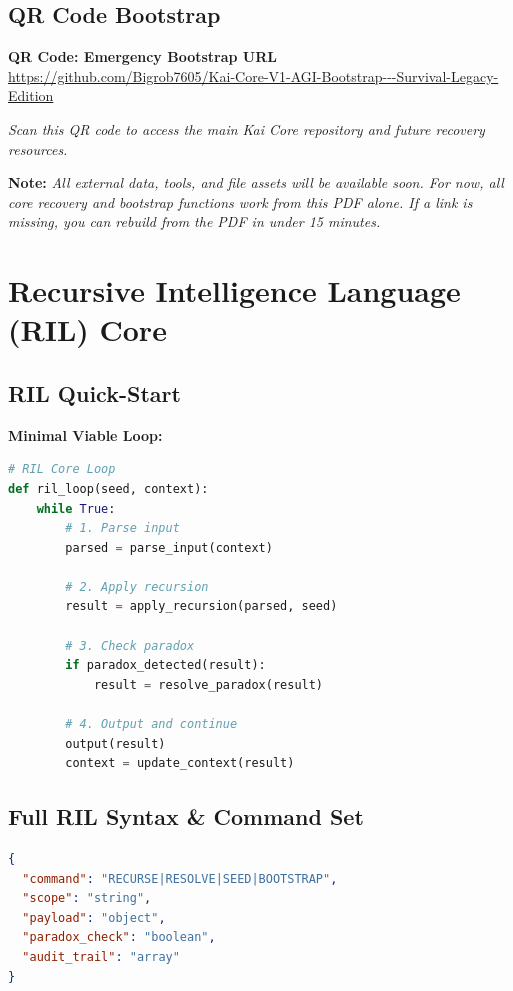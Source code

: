 \documentclass[11pt]{report}
\newcommand{\mainrepo}{\url{https://github.com/Bigrob7605/Kai-Core-V1-AGI-Bootstrap---Survival-Legacy-Edition}}
\newcommand{\linknote}{\textit{All external data, tools, and file assets will be available soon. For now, all core recovery and bootstrap functions work from this PDF alone. If a link is missing, you can rebuild from the PDF in under 15 minutes.}}
\begin{document}
\section{QR Code Bootstrap}
\begin{center}
\textbf{QR Code: Emergency Bootstrap URL}\\
\mainrepo
\end{center}

\textit{Scan this QR code to access the main Kai Core repository and future recovery resources.}

\textbf{Note:} \linknote

\chapter{Recursive Intelligence Language (RIL) Core}

\section{RIL Quick-Start}
\textbf{Minimal Viable Loop:}

\begin{lstlisting}[language=python,caption={RIL Quick-Start}]
# RIL Core Loop
def ril_loop(seed, context):
    while True:
        # 1. Parse input
        parsed = parse_input(context)
        
        # 2. Apply recursion
        result = apply_recursion(parsed, seed)
        
        # 3. Check paradox
        if paradox_detected(result):
            result = resolve_paradox(result)
        
        # 4. Output and continue
        output(result)
        context = update_context(result)
\end{lstlisting}

\section{Full RIL Syntax \& Command Set}
\begin{lstlisting}[language=json,caption={RIL Command Structure}]
{
  "command": "RECURSE|RESOLVE|SEED|BOOTSTRAP",
  "scope": "string",
  "payload": "object",
  "paradox_check": "boolean",
  "audit_trail": "array"
}
\end{lstlisting}
\end{document}
